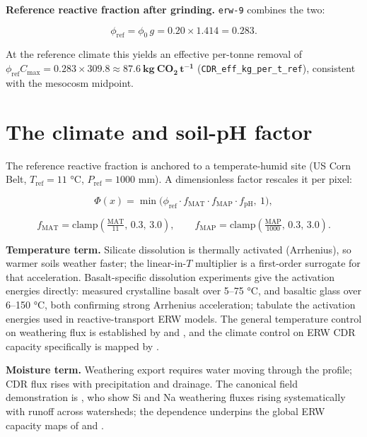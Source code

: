 \documentclass[openany]{book}
\begin{document}
\textbf{Reference reactive fraction after grinding.} \texttt{erw-9} combines the
two:

\[
\phi_{\text{ref}} = \phi_0\, g = 0.20\times 1.414 = \mathbf{0.283}.
\]

At the reference climate this yields an effective per-tonne removal of
\(\phi_{\text{ref}}C_{\max}=0.283\times309.8\approx \mathbf{87.6\ kg\ CO_2\,t^{-1}}\)
(\texttt{CDR\_eff\_kg\_per\_t\_ref}), consistent with the \citet{lewis2021}
mesocosm midpoint.

\chapter{The climate and soil-pH factor}\label{ch:climate}

The reference reactive fraction is anchored to a temperate-humid site (US Corn
Belt, \(T_{\text{ref}}=11\) °C, \(P_{\text{ref}}=1000\) mm). A dimensionless
factor rescales it per pixel:

\[
\Phi(x) = \min\!\Big(\phi_{\text{ref}}\cdot f_{\text{MAT}}\cdot f_{\text{MAP}}\cdot f_{\text{pH}},\ 1\Big),
\]

\[
f_{\text{MAT}} = \mathrm{clamp}\!\left(\tfrac{\text{MAT}}{11},\,0.3,\,3.0\right),
\qquad
f_{\text{MAP}} = \mathrm{clamp}\!\left(\tfrac{\text{MAP}}{1000},\,0.3,\,3.0\right).
\]

\textbf{Temperature term.} Silicate dissolution is thermally activated
(Arrhenius), so warmer soils weather faster; the linear-in-\(T\) multiplier is a
first-order surrogate for that acceleration. Basalt-specific dissolution
experiments give the activation energies directly: \citet{gudbrandsson2011}
measured crystalline basalt over 5--75 °C, and \citet{gislason2003} basaltic
glass over 6--150 °C, both confirming strong Arrhenius acceleration;
\citet{palandri2004} tabulate the activation energies used in reactive-transport
ERW models. The general temperature control on weathering flux is established by
\citet{whitebrantley2003} and \citet{brantley2008}, and the climate control on
ERW CDR capacity specifically is mapped by \citet{baek2023}.

\textbf{Moisture term.} Weathering export requires water moving through the
profile; CDR flux rises with precipitation and drainage. The canonical field
demonstration is \citet{whiteblum1995}, who show Si and Na weathering fluxes
rising systematically with runoff across watersheds; the dependence underpins
the global ERW capacity maps of \citet{baek2023} and \citet{beerling2020}.
\end{document}
